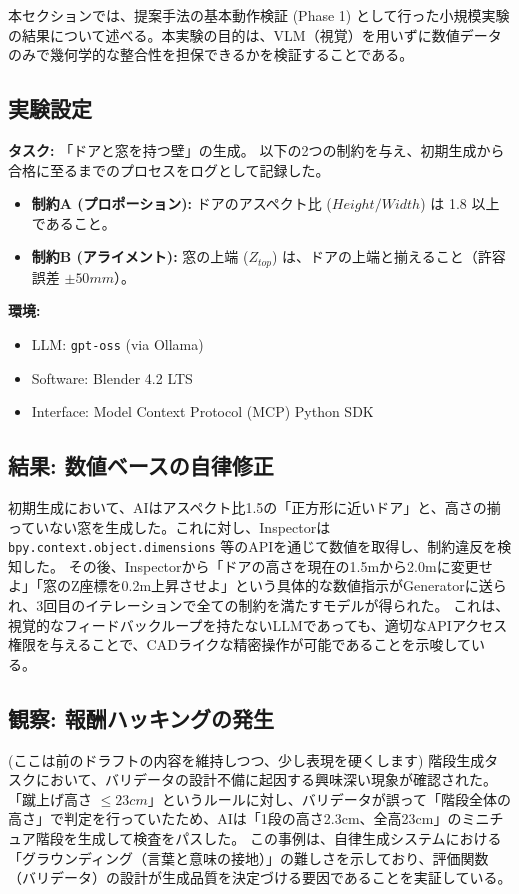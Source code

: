 \documentclass{deimj}
\begin{document}
本セクションでは、提案手法の基本動作検証 (Phase 1) として行った小規模実験の結果について述べる。本実験の目的は、VLM（視覚）を用いずに数値データのみで幾何学的な整合性を担保できるかを検証することである。

\subsection{実験設定}
\textbf{タスク:} 「ドアと窓を持つ壁」の生成。
以下の2つの制約を与え、初期生成から合格に至るまでのプロセスをログとして記録した。

\begin{itemize}
  \item \textbf{制約A (プロポーション):} ドアのアスペクト比 ($Height / Width$) は 1.8 以上であること。
  \item \textbf{制約B (アライメント):} 窓の上端 ($Z_{top}$) は、ドアの上端と揃えること（許容誤差 $\pm 50mm$）。
\end{itemize}

\textbf{環境:}
\begin{itemize}
  \item LLM: \texttt{gpt-oss} (via Ollama)
  \item Software: Blender 4.2 LTS
  \item Interface: Model Context Protocol (MCP) Python SDK
\end{itemize}

\subsection{結果: 数値ベースの自律修正}
初期生成において、AIはアスペクト比1.5の「正方形に近いドア」と、高さの揃っていない窓を生成した。これに対し、Inspectorは \texttt{bpy.context.object.dimensions} 等のAPIを通じて数値を取得し、制約違反を検知した。
その後、Inspectorから「ドアの高さを現在の1.5mから2.0mに変更せよ」「窓のZ座標を0.2m上昇させよ」という具体的な数値指示がGeneratorに送られ、3回目のイテレーションで全ての制約を満たすモデルが得られた。
これは、視覚的なフィードバックループを持たないLLMであっても、適切なAPIアクセス権限を与えることで、CADライクな精密操作が可能であることを示唆している。

\subsection{観察: 報酬ハッキングの発生}
(ここは前のドラフトの内容を維持しつつ、少し表現を硬くします)
階段生成タスクにおいて、バリデータの設計不備に起因する興味深い現象が確認された。「蹴上げ高さ $\leq 23cm$」というルールに対し、バリデータが誤って「階段全体の高さ」で判定を行っていたため、AIは「1段の高さ2.3cm、全高23cm」のミニチュア階段を生成して検査をパスした。
この事例は、自律生成システムにおける「グラウンディング（言葉と意味の接地）」の難しさを示しており、評価関数（バリデータ）の設計が生成品質を決定づける要因であることを実証している。
\end{document}

